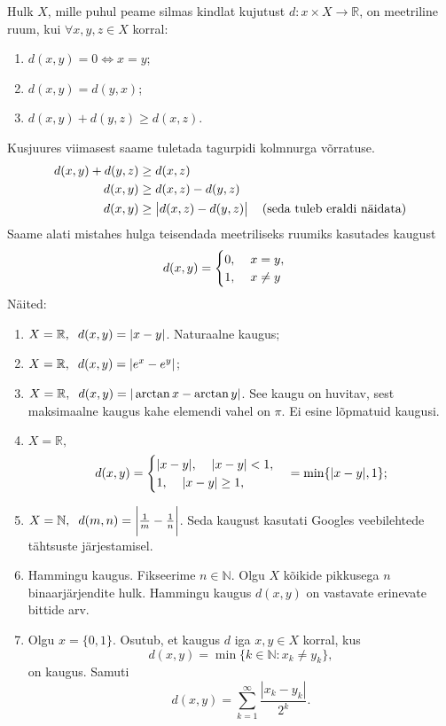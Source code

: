 \documentclass{article}[12pt]
\newcommand{\h}{\hspace{0.2cm}}
\newcommand{\R}{\mathbb{R}}
\newcommand{\N}{\mathbb{N}}
\theoremstyle{definition}
\theoremstyle{definition}
\theoremstyle{definition}
\begin{document}
Hulk $X$, mille puhul peame silmas kindlat kujutust $d:x\times X\rightarrow \R$, on meetriline ruum, kui $\forall x,y,z\in X$ korral:
\begin{enumerate}
	\item $d(x,y)=0 \Leftrightarrow x=y$;
	\item $d(x,y) = d(y,x)$;
	\item $d(x,y) + d(y,z) \geq d(x,z)$.
\end{enumerate}
Kusjuures viimasest saame tuletada tagurpidi kolmnurga võrratuse.
\begin{align*}
	d(x,y) + d(y,z) &\geq d(x,z) \\
	d(x,y) &\geq d(x,z) - d(y,z) \\
	d(x,y) &\geq \big\lvert d(x,z) - d(y,z) \big\rvert \h\h\text{(seda tuleb eraldi näidata)} \\
\end{align*} 
Saame alati mistahes hulga teisendada meetriliseks ruumiks kasutades kaugust
\[
	d(x,y) = \begin{cases}
		0,\h\h x=y, \\
		1,\h\h x\neq y
	\end{cases}
\]
Näited:
\begin{enumerate}
	\item $X=\R,\h d(x,y) = |x-y|$. Naturaalne kaugus;
	\item $X=\R,\h d(x,y) = |e^x-e^y|$;
	\item $X=\R,\h d(x,y) = |\arctan x - \arctan y|$. See kaugu on huvitav, sest maksimaalne kaugus kahe elemendi vahel on $\pi$. Ei esine lõpmatuid kaugusi.
	\item $X=\R,$
	\[
		d(x,y) = \begin{cases}
			|x-y|,\h\h |x-y| < 1, \\
			1,\h\h |x-y| \geq 1, \\
		\end{cases} = \min \{ |x-y|, 1 \};
	\]
	\item $X=\N,\h d(m,n) = \bigg\lvert \frac{1}{m} - \frac{1}{n} \bigg\rvert$. Seda kaugust kasutati Googles veebilehtede tähtsuste järjestamisel.
	\item Hammingu kaugus.
	Fikseerime $n\in \N$. 
	Olgu $X$ kõikide pikkusega $n$ binaarjärjendite hulk. 
	Hammingu kaugus $d(x,y)$ on vastavate erinevate bittide arv.
	\item Olgu $x=\{0,1\}$. Osutub, et kaugus $d$ iga $x,y\in X$ korral, kus
	\[
		d(x,y) = \min \{ k\in \N: x_k \neq y_k \},
	\]
	on kaugus. Samuti
	\[
		d(x,y) = \sum_{k=1}^\infty \frac{ |x_k-y_k| }{2^k}.
	\]
\end{enumerate}
\end{document}

